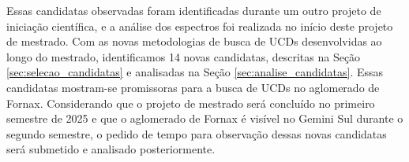 Essas candidatas observadas foram identificadas durante um outro projeto de iniciação científica, e a análise dos espectros foi realizada no início deste projeto de mestrado. Com as novas metodologias de busca de UCDs desenvolvidas ao longo do mestrado, identificamos 14 novas candidatas, descritas na Seção \ref{sec:selecao_candidatas} e analisadas na Seção \ref{sec:analise_candidatas}. Essas candidatas mostram-se promissoras para a busca de UCDs no aglomerado de Fornax. Considerando que o projeto de mestrado será concluído no primeiro semestre de 2025 e que o aglomerado de Fornax é visível no Gemini Sul durante o segundo semestre, o pedido de tempo para observação dessas novas candidatas será submetido e analisado posteriormente.












